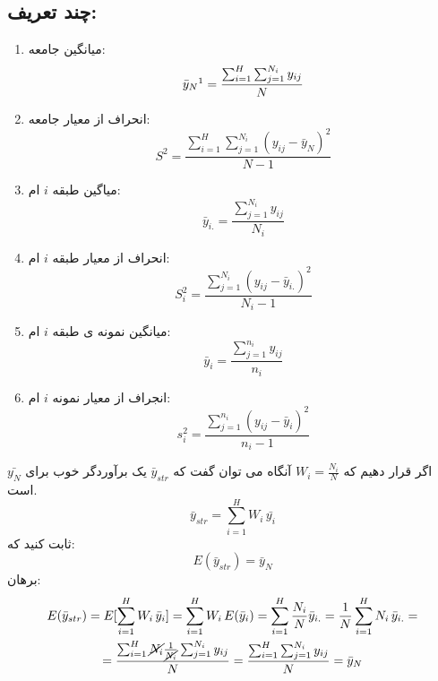 \subsection*{چند تعریف:}
\begin{enumerate}
	\item میانگین جامعه:
	\begin{equation*}
		\bar{y}_N\footnotemark[1]=\frac{\sum_{i=1}^{H} \sum_{j=1}^{N_i}y_{ij}}{N}
	\end{equation*}
	\item انحراف از معیار جامعه:
	\begin{equation*}
		S^2=\frac{\sum_{i=1}^{H} \sum_{j=1}^{N_i} (y_{ij}-\bar{y}_N)^2}{N-1}
	\end{equation*}
	\item میاگین طبقه 
	$i$
	ام:
	\begin{equation*}
		\bar{y}_{i.}=\frac{\sum_{j=1}^{N_i}y_{ij}}{N_i}
	\end{equation*}
	\item انحراف از معیار طبقه 
	$i$
	ام:
	\begin{equation*}
		S_i^2=\frac{\sum_{j=1}^{N_i}(y_{ij}-\bar{y}_{i.})^2}{N_i-1}
	\end{equation*}
	\item میانگین نمونه ی طبقه 
	$i$
	ام:
	\begin{equation*}
		\bar{y}_{i}=\frac{\sum_{j=1}^{n_i}y_{ij}}{n_i}
	\end{equation*}
	\item انجراف از معیار نمونه 
	$i$
	ام:
	\begin{equation*}
		s_i^2=\frac{\sum_{j=1}^{n_i}(y_{ij}-\bar{y}_{i})^2}{n_i-1}
	\end{equation*}
\end{enumerate}
اگر قرار دهیم که 
$W_i=\frac{N_i}{N}$
آنگاه می توان گفت که 
$\bar{y}_{str}$
یک برآوردگر خوب برای 
$\bar{y_N}$
است.
\begin{equation*}
	\bar{y}_{str}=\sum_{i=1}^{H}W_i\, \bar{y_i}
\end{equation*}
ثابت کنید که:
\begin{equation*}
	E(\bar{y}_{str})=\bar{y}_N
\end{equation*}
برهان:
\begin{multline*}
	E(\bar{y}_{str})=E[\sum_{i=1}^{H}W_i\, \bar{y}_i]
	=\sum_{i=1}^{H}W_i\,E(\bar{y}_i)=
	\sum_{i=1}^{H}\frac{N_i}{N} \bar{y}_{i.}=\frac{1}{N}\sum_{i=1}^{H}N_i\,\bar{y}_{i.}
	=\\=\frac{\sum_{i=1}^{H}\cancel{N_i}\frac{1}{\cancel{N_i}}\sum_{j=1}^{N_i}y_{ij}}{N}
	=\frac{\sum_{i=1}^{H}\sum_{j=1}^{N_i}y_{ij}}{N}=\bar{y}_N
\end{multline*}
